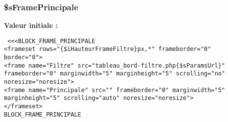 \subsubsection{\setlength{\rightskip}{0pt plus 5cm}\$sFramePrincipale}\label{tableau__bord-index_8php_3e1657b01b48cd2928b752bbd726627e}


\textbf{Valeur initiale :}

\begin{Code}\begin{verbatim} <<<BLOCK_FRAME_PRINCIPALE
<frameset rows="{$iHauteurFrameFiltre}px,*" frameborder="0" border="0">
<frame name="Filtre" src="tableau_bord-filtre.php{$sParamsUrl}" frameborder="0" marginwidth="5" marginheight="5" scrolling="no" noresize="noresize">
<frame name="Principale" src="" frameborder="0" marginwidth="5" marginheight="5" scrolling="auto" noresize="noresize">
</frameset>
BLOCK_FRAME_PRINCIPALE
\end{verbatim}
\end{Code}
